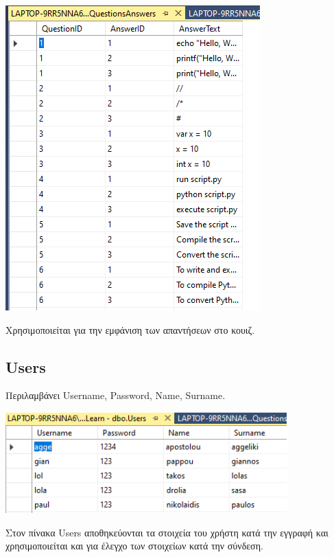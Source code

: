 \documentclass[12pt]{article}
\newcommand{\en}[1]{\foreignlanguage{English}{#1}}
\begin{document}
\begin{center}
    
    \includegraphics[width=0.8\linewidth]{questionsanswersdb.png}
\end{center}

Χρησιμοποιείται για την εμφάνιση των απαντήσεων στο κουιζ.

\newpage
\subsection*{\en{Users}}

Περιλαμβάνει \en{Username, Password, Name, Surname}.



\begin{center}

    \includegraphics[width=0.8\linewidth]{usersdb.png}
\end{center}


Στον πίνακα \en{Users} αποθηκεύονται τα στοιχεία του χρήστη κατά την εγγραφή και χρησιμοποιείται και για έλεγχο των στοιχείων κατά την σύνδεση.
\end{document}
